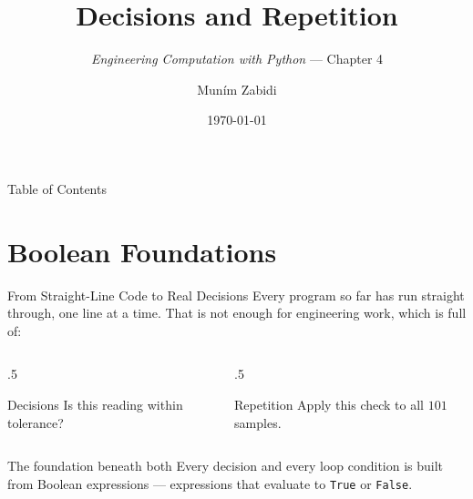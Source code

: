 \documentclass[9pt,aspectratio=169,xcolor=table]{beamer}
\title{Decisions and Repetition}
\subtitle{\emph{Engineering Computation with Python} --- Chapter 4}
\author{Mun\'{i}m Zabidi}
\institute{\color{primary}Faculty of Electrical Engineering, Universiti Teknologi Malaysia}
\date{\today}
\begin{document}
\titlepage

\begin{frame}{Table of Contents}
    \tableofcontents
\end{frame}

\section{Boolean Foundations}

\begin{frame}{From Straight-Line Code to Real Decisions}
    \leavevmode
    Every program so far has run straight through, one line at a time.
    That is not enough for engineering work, which is full of:

    \vspace{2mm}
    \begin{columns}[t]
        \begin{column}{.5\textwidth}
            \begin{block}{Decisions}
                \small Is this reading within tolerance?
            \end{block}
        \end{column}
        \begin{column}{.5\textwidth}
            \begin{block}{Repetition}
                \small Apply this check to all $101$ samples.
            \end{block}
        \end{column}
    \end{columns}

    \vspace{3mm}
    \begin{alertblock}{The foundation beneath both}
        Every decision and every loop condition is built from
        \alert{Boolean expressions} --- expressions that evaluate to
        \texttt{True} or \texttt{False}.
    \end{alertblock}
\end{frame}
\end{document}
